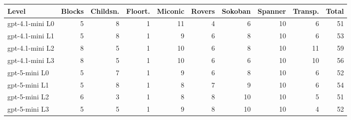 \begin{tabular}{lrrrrrrrrr}
\toprule
Level & Blocks & Childsn. & Floort. & Miconic & Rovers & Sokoban & Spanner & Transp. & Total \\
\midrule
gpt-4.1-mini L0 & 5 & 8 & 1 & 11 & 4 & 6 & 10 & 6 & 51 \\
gpt-4.1-mini L1 & 5 & 8 & 1 & 9 & 6 & 8 & 10 & 6 & 53 \\
gpt-4.1-mini L2 & 8 & 5 & 1 & 10 & 6 & 8 & 10 & 11 & 59 \\
gpt-4.1-mini L3 & 8 & 5 & 1 & 10 & 6 & 6 & 10 & 10 & 56 \\
gpt-5-mini L0 & 5 & 7 & 1 & 9 & 6 & 8 & 10 & 6 & 52 \\
gpt-5-mini L1 & 5 & 8 & 1 & 8 & 7 & 9 & 10 & 6 & 54 \\
gpt-5-mini L2 & 6 & 3 & 1 & 8 & 8 & 10 & 10 & 5 & 51 \\
gpt-5-mini L3 & 5 & 5 & 1 & 9 & 8 & 10 & 10 & 4 & 52 \\
\bottomrule
\end{tabular}
